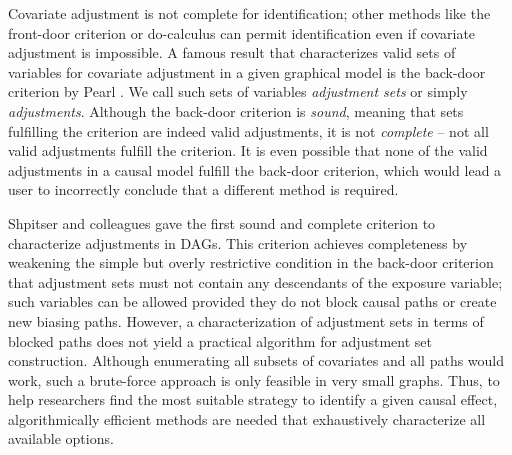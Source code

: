 Covariate adjustment is not complete for identification; other methods like the front-door criterion \cite{Fulcher2017} or do-calculus \cite{Pearl2009} can permit identification even if covariate adjustment is impossible. 
A famous result that characterizes valid sets of variables for covariate adjustment in a given graphical model is the back-door criterion by Pearl \citet{Pearl2009}. We call such sets of variables \emph{adjustment sets} or simply \emph{adjustments}. Although the back-door criterion is \emph{sound}, meaning that sets fulfilling the criterion are indeed valid adjustments, it is not \emph{complete} -- not all valid adjustments fulfill the criterion.  
It is even possible that none of the valid adjustments in a causal
model fulfill the back-door criterion, which would lead a user to incorrectly
conclude that a different method is required. 

Shpitser and colleagues \cite{ShpitserVR2010} gave the 
first sound and complete criterion to characterize adjustments 
in DAGs.
This criterion achieves completeness by weakening the simple but overly restrictive
condition in the back-door criterion that adjustment sets must not contain 
any descendants of the exposure variable; such variables can be allowed 
provided they do not block causal paths or create new biasing paths.
However, a characterization of adjustment sets in terms of blocked paths does not 
yield a practical algorithm for adjustment set construction. 
Although enumerating all subsets of covariates
and all paths would work, such a brute-force approach
is only feasible in very small graphs. Thus, to help researchers find the most suitable strategy to identify a given causal effect, algorithmically efficient methods are needed that exhaustively characterize all available options. 

